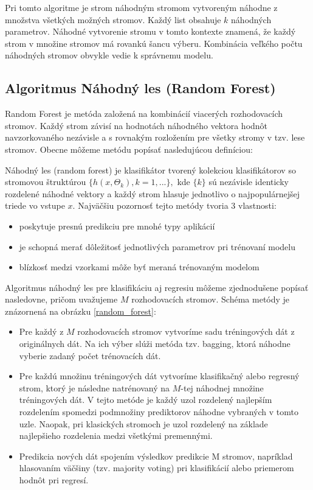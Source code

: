 Pri tomto algoritme je strom náhodným stromom vytvoreným náhodne z množstva všetkých možných stromov. Každý list obsahuje $k$ náhodných parametrov. Náhodné vytvorenie stromu v tomto kontexte znamená, že každý strom v množine stromov má rovankú šancu výberu. Kombinácia veľkého počtu náhodných stromov obvykle vedie k správnemu modelu. 

\subsection{Algoritmus Náhodný les (Random Forest)}

Random Forest \cite{breiman} je metóda založená na kombinácií viacerých rozhodovacích stromov. Každý strom závisí na hodnotách náhodného vektora hodnôt navzorkovaného nezávisle a s rovnakým rozložením pre všetky stromy v tzv. lese stromov. Obecne môžeme metódu popísať nasledujúcou definíciou:

Náhodný les (random forest) je klasifikátor tvorený kolekciou klasifikátorov so stromovou štruktúrou $\{h(x,\Theta_{k}), k=1, ...\}, $ kde $\{k\}$ sú nezávisle identicky rozdelené náhodné vektory a každý strom hlasuje jednotlivo o najpopulárnejšej triede vo vstupe $x$.
\newpage
Najväčšiu pozornosť tejto metódy tvoria 3 vlastnosti:
\begin{itemize}
	\item poskytuje presnú predikciu pre mnohé typy aplikácií
	\item je schopná merať dôležitosť jednotlivých parametrov pri trénovaní modelu
	\item blízkosť medzi vzorkami môže byť meraná trénovaným modelom
\end{itemize} 

Algoritmus náhodný les pre klasifikáciu aj regresiu môžeme zjednodušene popísať nasledovne, pričom uvažujeme $M$ rozhodovacích stromov. Schéma metódy je znázornená na obrázku \ref{random_forest}:
\begin{itemize}
	\item Pre každý z $M$ rozhodovacích stromov vytvoríme sadu tréningových dát z originálnych dát. Na ich výber slúži metóda tzv. bagging, ktorá náhodne vyberie zadaný počet trénovacích dát.
	\item Pre každú množinu tréningových dát vytvoríme klasifikačný alebo regresný strom, ktorý je následne natrénovaný na $M$-tej náhodnej množine tréningových dát. V tejto metóde je každý uzol rozdelený najlepším rozdelením spomedzi podmnožiny prediktorov náhodne vybraných v tomto uzle. Naopak, pri klasických stromoch je uzol rozdelený na základe najlepšieho rozdelenia medzi všetkými premennými.
	\item Predikcia nových dát spojením výsledkov predikcie M stromov, napríklad hlasovaním väčšiny (tzv. majority voting) pri klasifikácií alebo priemerom hodnôt pri regresí.
\end{itemize}

